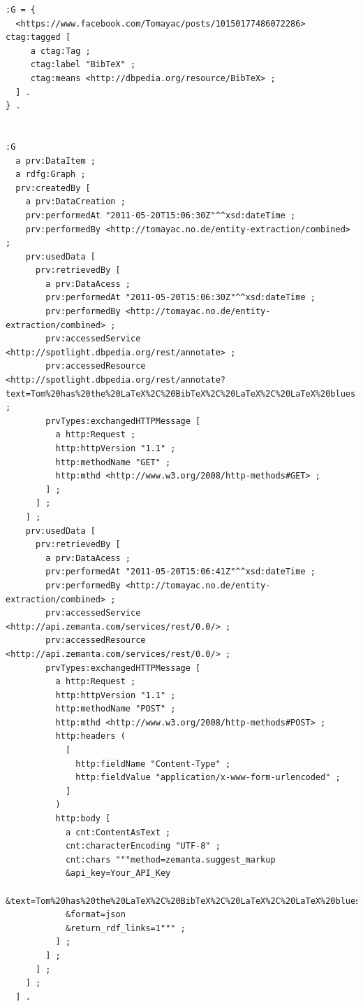 \documentclass[twocolumn]{article}
\begin{document}
\begin{lstlisting}
:G = {
  <https://www.facebook.com/Tomayac/posts/10150177486072286> ctag:tagged [
     a ctag:Tag ;
     ctag:label "BibTeX" ;
     ctag:means <http://dbpedia.org/resource/BibTeX> ;
  ] .
} .


:G
  a prv:DataItem ;
  a rdfg:Graph ;
  prv:createdBy [
    a prv:DataCreation ;
    prv:performedAt "2011-05-20T15:06:30Z"^^xsd:dateTime ;
    prv:performedBy <http://tomayac.no.de/entity-extraction/combined> ;
    prv:usedData [
      prv:retrievedBy [
        a prv:DataAcess ;
        prv:performedAt "2011-05-20T15:06:30Z"^^xsd:dateTime ;
        prv:performedBy <http://tomayac.no.de/entity-extraction/combined> ;
        prv:accessedService <http://spotlight.dbpedia.org/rest/annotate> ;
        prv:accessedResource <http://spotlight.dbpedia.org/rest/annotate?text=Tom%20has%20the%20LaTeX%2C%20BibTeX%2C%20LaTeX%2C%20LaTeX%20blues...&confidence=0.4&support=20> ;
        prvTypes:exchangedHTTPMessage [
          a http:Request ;
          http:httpVersion "1.1" ;
          http:methodName "GET" ;
          http:mthd <http://www.w3.org/2008/http-methods#GET> ;
        ] ;
      ] ;
    ] ;
    prv:usedData [
      prv:retrievedBy [
        a prv:DataAcess ;
        prv:performedAt "2011-05-20T15:06:41Z"^^xsd:dateTime ;
        prv:performedBy <http://tomayac.no.de/entity-extraction/combined> ;
        prv:accessedService <http://api.zemanta.com/services/rest/0.0/> ;
        prv:accessedResource <http://api.zemanta.com/services/rest/0.0/> ;
        prvTypes:exchangedHTTPMessage [
          a http:Request ;
          http:httpVersion "1.1" ;
          http:methodName "POST" ;
          http:mthd <http://www.w3.org/2008/http-methods#POST> ;
          http:headers (
            [
              http:fieldName "Content-Type" ;
              http:fieldValue "application/x-www-form-urlencoded" ;
            ]   
          )
          http:body [
            a cnt:ContentAsText ;
            cnt:characterEncoding "UTF-8" ;
            cnt:chars """method=zemanta.suggest_markup
            &api_key=Your_API_Key
            &text=Tom%20has%20the%20LaTeX%2C%20BibTeX%2C%20LaTeX%2C%20LaTeX%20blues...
            &format=json
            &return_rdf_links=1""" ;
          ] ;
        ] ;
      ] ;
    ] ;
  ] .
\end{lstlisting}
\vspace{1.0em}
\end{document}
